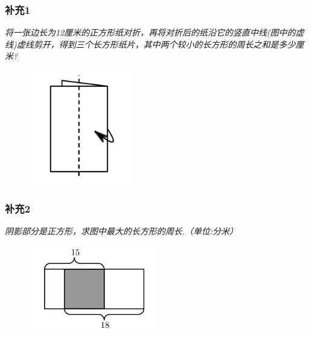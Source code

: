 \begin{frame}
    \frametitle{补充1}
    \textit{将一张边长为12厘米的正方形纸对折，再将对折后的纸沿它的竖直中线(图中的虚线)虚线剪开，得到三个长方形纸片，其中两个较小的长方形的周长之和是多少厘米?}
    \begin{figure}[H] 
        \centering
        \includegraphics[width=0.4\textwidth]{./pics/Chapter_1/buchong1.png}
    \end{figure}
\end{frame}

\begin{frame}
    \frametitle{补充2}
    \textit{阴影部分是正方形，求图中最大的长方形的周长.（单位:分米）}
    \begin{figure}[H] 
        \centering
        \includegraphics[width=0.5\textwidth]{./pics/Chapter_1/buchong2.png}
    \end{figure}
\end{frame}